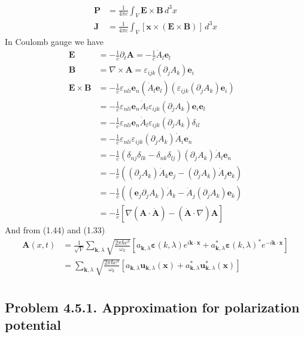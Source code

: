 \documentclass[10pt,a4paper]{book}
\theoremstyle{definition}
\begin{document}
\begin{align}
\mathbf{P}&=\frac{1}{4\pi c}\int_V\mathbf{E}\times\mathbf{B}\,d^3x\\
\mathbf{J}&=\frac{1}{4\pi c}\int_V[\mathbf{x}\times(\mathbf{E}\times\mathbf{B})]\,d^3x
\end{align}
In Coulomb gauge we have
\begin{align}
\mathbf{E}&=-\frac{1}{c}\partial_t\mathbf{A}=-\frac{1}{c}\dot{A}_l\mathbf{e}_l\\
\mathbf{B}&=\nabla\times\mathbf{A}=\varepsilon_{ijk}(\partial_jA_k)\mathbf{e}_i\\
\mathbf{E}\times\mathbf{B}
&=-\frac{1}{c}\varepsilon_{nli}\mathbf{e}_n(\dot{A}_l\mathbf{e}_l)(\varepsilon_{ijk}(\partial_jA_k)\mathbf{e}_i)\\
&=-\frac{1}{c}\varepsilon_{nli}\mathbf{e}_n\dot{A}_l\varepsilon_{ijk}(\partial_jA_k)\mathbf{e}_i\mathbf{e}_l\\
&=-\frac{1}{c}\varepsilon_{nli}\mathbf{e}_n\dot{A}_l\varepsilon_{ijk}(\partial_jA_k)\delta_{il}\\
&=-\frac{1}{c}\varepsilon_{nli}\varepsilon_{ijk}(\partial_jA_k)\dot{A}_i\mathbf{e}_n\\
&=-\frac{1}{c}(\delta_{nj}\delta_{lk}-\delta_{nk}\delta_{lj})(\partial_jA_k)\dot{A}_l\mathbf{e}_n\\
&=-\frac{1}{c}((\partial_jA_k)\dot{A}_k\mathbf{e}_j-(\partial_jA_k)\dot{A}_j\mathbf{e}_k)\\
&=-\frac{1}{c}((\mathbf{e}_j\partial_jA_k)\dot{A}_k-\dot{A}_j(\partial_jA_k)\mathbf{e}_k)\\
&=-\frac{1}{c}[\nabla(\mathbf{A}\cdot\dot{\mathbf{A}})-(\dot{\mathbf{A}}\cdot\nabla)\mathbf{A}]
\end{align}
And from (1.44) and (1.33)
\begin{align}
\mathbf{A}(x,t)&=\frac{1}{\sqrt{V}}\sum_{\mathbf{k},\lambda}\sqrt{\frac{2\pi\hbar c^3}{\omega_k}}\left[
a_{\mathbf{k},\lambda}\boldsymbol{\varepsilon}(k,\lambda)e^{i\mathbf{k}\cdot\mathbf{x}}
+a^*_{\mathbf{k},\lambda}\boldsymbol{\varepsilon}(k,\lambda)^*e^{-i\mathbf{k}\cdot\mathbf{x}}\right]\\
&=\sum_{\mathbf{k},\lambda}\sqrt{\frac{2\pi\hbar c^3}{\omega_k}}\left[
a_{\mathbf{k},\lambda}\mathbf{u}_{\mathbf{k},\lambda}(\mathbf{x})
+a^*_{\mathbf{k},\lambda}\mathbf{u}^*_{\mathbf{k},\lambda}(\mathbf{x})\right]\\
\end{align}

\subsection{Problem 4.5.1. Approximation for polarization potential}
\end{document}
